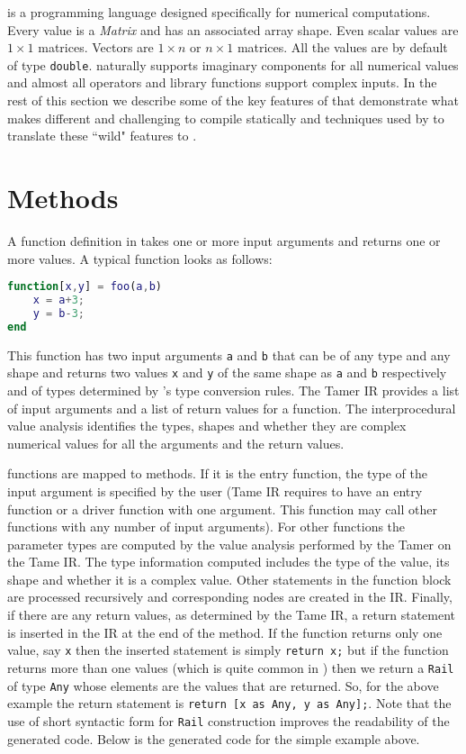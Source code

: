 \matlab is a programming language designed specifically for numerical
computations. Every value is a \emph{Matrix} and has an associated array
shape.  Even scalar values are $1\times1$ matrices. Vectors are
$1\times n$ or $n \times 1$ matrices. All the values are by default of
type \verb+double+.  \matlab naturally supports imaginary components for
all numerical values and almost all operators and library functions
support complex inputs. In the rest of this section we describe some of
the key features of \matlab that demonstrate what makes \matlab 
different and challenging to compile statically and techniques used by
\mixten to translate these ``wild" features to \xten.

\section{Methods}

A function definition in \matlab takes one or more input arguments and
returns one or more values. A typical \matlab function looks as follows:

\begin{lstlisting}[language=Matlab,numbers=none]
function[x,y] = foo(a,b)
    x = a+3;
    y = b-3;
end
\end{lstlisting}

This function has two input arguments \verb|a| and \verb|b| that
can be of any type and any shape and returns two values \verb|x| and
\verb|y| of the same shape as \verb|a| and \verb|b| respectively and of
types determined by \matlab's type conversion rules. The Tamer IR
provides a list of input arguments and a list of return values for a
function. The interprocedural value analysis identifies the types,
shapes and whether they are complex numerical values for all the
arguments and the return values.

\matlab functions are mapped to \xten methods. If it is the entry
function, the type of the input argument is specified by the user (Tame
IR requires to have an entry function or a driver function with one
argument. This function may call other functions with any number of
input arguments). For other functions the parameter types are computed
by the value analysis performed by the Tamer on the Tame IR. The type
information computed includes the type of the value, its shape and
whether it is a complex value. Other statements in the function block
are processed recursively and corresponding nodes are created in the
\xten IR. Finally, if there are any return values, as determined by the
Tame IR, a return statement is inserted in the \xten IR at the end of
the method. If the function returns only one value, say \verb|x| then
the inserted statement is simply \verb|return x;| but if the function
returns more than one values (which is quite common in \matlab) then we
return a \texttt{Rail} of type \verb|Any| whose elements are the
values that are returned. So, for the above example the return statement
is \verb|return [x as Any, y as Any];|. Note that the use of short syntactic form
for \texttt{Rail} construction improves the readability of the
generated code. Below is the generated code for the simple example
above.

